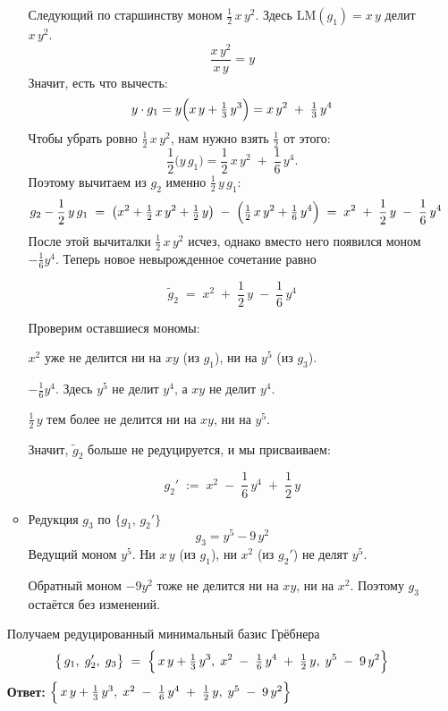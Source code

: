 \documentclass[a4paper]{article}
\begin{document}
\begin{enumerate}
\begin{itemize}
  Следующий по старшинству моном $\tfrac12\,x\,y^2$. Здесь $\mathrm{LM}(g_1)=x\,y$ 
  делит $x\,y^2$.
    $$
    \frac{x\,y^2}{\,x\,y\,} = y
    $$
    Значит, есть что вычесть:
    $$
    y \cdot g_1 
    = y\Bigl(x\,y + \tfrac13\,y^3\Bigr)
    = x\,y^2 \;+\; \tfrac13\,y^4
    $$
    Чтобы убрать ровно $\tfrac12\,x\,y^2$, нам нужно взять $\tfrac12$ от этого:
    $$
    \frac12 \bigl(y\,g_1\bigr) 
    = \frac12\,x\,y^2 \;+\; \frac{1}{6}\,y^4.
    $$
    Поэтому вычитаем из $g_2$ именно $\tfrac12\,y\,g_1$:
    $$
    g_2 
    - \frac12\,y\,g_1
    \;=\;
    \bigl(x^2 + \tfrac12\,x\,y^2 + \tfrac12\,y\bigr)
    \;-\;\Bigl(\tfrac12\,x\,y^2 + \tfrac{1}{6}\,y^4\Bigr)
    \;=\;
    x^2 
    \;+\; \frac12\,y 
    \;-\; \frac{1}{6}\,y^4
    $$
    После этой вычиталки $\tfrac12\,x\,y^2$ исчез, однако вместо него появился
     моном $-\tfrac{1}{6}y^4$.
   Теперь новое невырожденное сочетание равно

    $$
    \tilde g_2 \;=\; x^2 \;+\; \frac12\,y \;-\; \frac{1}{6}\,y^4
    $$

    Проверим оставшиеся мономы:

     $x^2$ уже не делится ни на $xy$ (из $g_1$), ни на $y^5$ (из $g_3$).

     $-\tfrac{1}{6}y^4$. Здесь $y^5$ не делит $y^4$, а $xy$ не делит $y^4$.

     $\tfrac12\,y$ тем более не делится ни на $xy$, ни на $y^5$.

      Значит, $\tilde g_2$ больше не редуцируется, и мы присваиваем:

    $$
    g_2' 
    \;:=\;
    x^2 \;-\; \frac{1}{6}\,y^4 \;+\; \frac12\,y
    $$

    \item Редукция $g_3$ по $\{g_1,\,g_2'\}$
    $$
    g_3 = y^5 - 9\,y^2
    $$
    Ведущий моном $y^5$. Ни $x\,y$ (из $g_1$), ни $x^2$ (из $g_2'$) не делят $y^5$.
    
    Обратный моном $-9y^2$ тоже не делится ни на $xy$, ни на $x^2$. Поэтому $g_3$ остаётся без изменений.
  \end{itemize}

  Получаем редуцированный минимальный базис Грёбнера
  $$
  \bigl\{\,g_1,\;g_2',\;g_3\bigr\} \;=\;
  \Bigl\{
  \,x\,y + \tfrac{1}{3}\,y^3,\;
  x^2 \;-\; \tfrac{1}{6}\,y^4 \;+\; \tfrac{1}{2}\,y,\;
  y^5 \;-\; 9\,y^2
  \Bigr\}
  $$
  \textbf{Ответ: } $\Bigl\{
  \,x\,y + \tfrac{1}{3}\,y^3,\;
  x^2 \;-\; \tfrac{1}{6}\,y^4 \;+\; \tfrac{1}{2}\,y,\;
  y^5 \;-\; 9\,y^2
  \Bigr\}$
  \end{enumerate}
\end{document}
